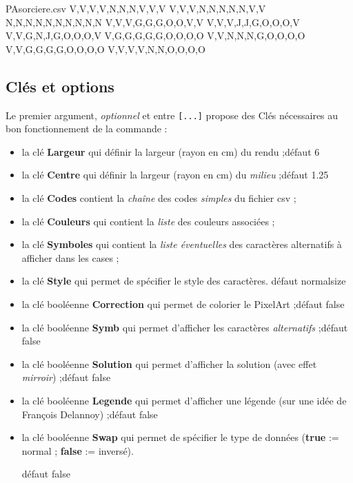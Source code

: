 \documentclass{article}
\newcommand\Cle[1]{{\bfseries\sffamily\textlangle #1\textrangle}}
\begin{document}
\begin{PresentationCode}{}
\begin{filecontents*}{PAsorciere.csv}
V,V,V,V,N,N,N,V,V,V
V,V,V,N,N,N,N,N,V,V
N,N,N,N,N,N,N,N,N,N
V,V,V,G,G,G,O,O,V,V
V,V,V,J,J,G,O,O,O,V
V,V,G,N,J,G,O,O,O,V
V,G,G,G,G,G,O,O,O,O
V,V,N,N,N,G,O,O,O,O
V,V,G,G,G,G,O,O,O,O
V,V,V,V,N,N,O,O,O,O
\end{filecontents*}

\end{PresentationCode}

\subsection{Clés et options}

Le premier argument, \textit{optionnel} et entre \texttt{[...]} propose des \textsf{Clés} nécessaires au bon fonctionnement de la commande :

\begin{itemize}
	\item la clé \Cle{Largeur} qui définir la largeur (rayon en cm) du rendu ;\hfill{}défaut \textsf{6}
	\item la clé \Cle{Centre} qui définir la largeur (rayon en cm) du \textit{milieu} ;\hfill{}défaut \textsf{1.25}
	\item la clé \Cle{Codes} contient la \textit{chaîne} des codes \textit{simples} du  fichier \textsf{csv} ;
	\item la clé \Cle{Couleurs} qui contient la \textit{liste} des couleurs associées ;
	\item la clé \Cle{Symboles} qui contient la \textit{liste éventuelles} des caractères alternatifs à afficher dans les cases ;
	\item la clé \Cle{Style} qui permet de spécifier le style des caractères. \hfill{}défaut \textsf{normalsize}
	\item la clé booléenne \Cle{Correction} qui permet de colorier le PixelArt ;\hfill{}défaut \textsf{false}
	\item la clé booléenne \Cle{Symb} qui permet d'afficher les caractères \textit{alternatifs} ;\hfill{}défaut \textsf{false}
	\item la clé booléenne \Cle{Solution} qui permet d'afficher la solution (avec effet \textit{mirroir}) ;\hfill{}défaut \textsf{false}
	\item la clé booléenne \Cle{Legende} qui permet d'afficher une légende (sur une idée de François Delannoy) ;\hfill{}défaut \textsf{false}
	\item la clé booléenne \Cle{Swap} qui permet de spécifier le type de données (\Cle{true} := normal ; \Cle{false} := inversé).
	
	\hfill{}défaut \textsf{false}
\end{itemize}
\end{document}

